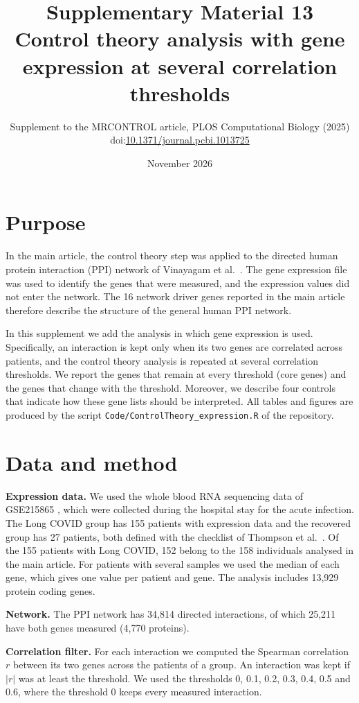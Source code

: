 \documentclass[11pt,a4paper]{article}
\title{\textbf{Supplementary Material 13}\\[0.3em]
\large Control theory analysis with gene expression at several correlation thresholds}
\author{\normalsize Supplement to the MRCONTROL article, PLOS Computational Biology (2025)\\
\normalsize doi:\href{https://doi.org/10.1371/journal.pcbi.1013725}{10.1371/journal.pcbi.1013725}}
\date{November 2026}
\begin{document}
\maketitle

\section{Purpose}

In the main article, the control theory step was applied to the directed human protein interaction (PPI) network of Vinayagam et al.\ \cite{vinayagam2011}. The gene expression file was used to identify the genes that were measured, and the expression values did not enter the network. The 16 network driver genes reported in the main article therefore describe the structure of the general human PPI network.

In this supplement we add the analysis in which gene expression is used. Specifically, an interaction is kept only when its two genes are correlated across patients, and the control theory analysis is repeated at several correlation thresholds. We report the genes that remain at every threshold (core genes) and the genes that change with the threshold. Moreover, we describe four controls that indicate how these gene lists should be interpreted. All tables and figures are produced by the script \texttt{Code/ControlTheory\_expression.R} of the repository.

\section{Data and method}

\textbf{Expression data.} We used the whole blood RNA sequencing data of GSE215865 \cite{thompson2023}, which were collected during the hospital stay for the acute infection. The Long COVID group has 155 patients with expression data and the recovered group has 27 patients, both defined with the checklist of Thompson et al.\ \cite{thompson2023}. Of the 155 patients with Long COVID, 152 belong to the 158 individuals analysed in the main article. For patients with several samples we used the median of each gene, which gives one value per patient and gene. The analysis includes 13,929 protein coding genes.

\textbf{Network.} The PPI network has 34,814 directed interactions, of which 25,211 have both genes measured (4,770 proteins).

\textbf{Correlation filter.} For each interaction we computed the Spearman correlation $r$ between its two genes across the patients of a group. An interaction was kept if $|r|$ was at least the threshold. We used the thresholds 0, 0.1, 0.2, 0.3, 0.4, 0.5 and 0.6, where the threshold 0 keeps every measured interaction.
\end{document}
